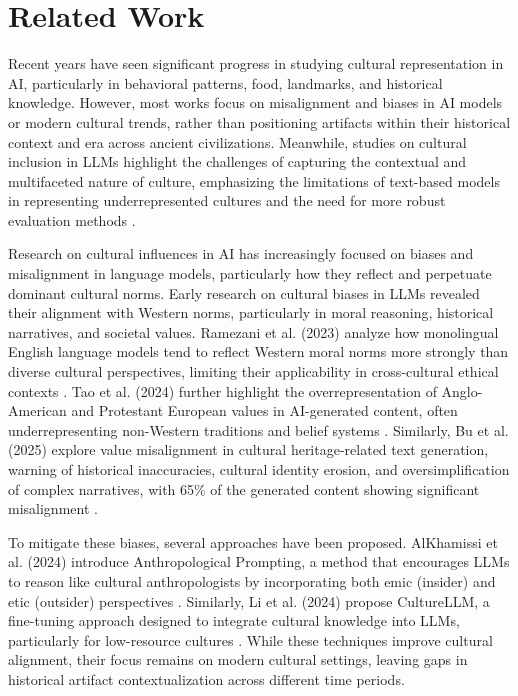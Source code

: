 \section{Related Work}
Recent years have seen significant progress in studying cultural representation in AI, particularly in behavioral patterns, food, landmarks, and historical knowledge. However, most works focus on misalignment and biases in AI models or modern cultural trends, rather than positioning artifacts within their historical context and era across ancient civilizations. Meanwhile, studies on cultural inclusion in LLMs highlight the challenges of capturing the contextual and multifaceted nature of culture, emphasizing the limitations of text-based models in representing underrepresented cultures and the need for more robust evaluation methods \cite{adilazuarda2024towards}.

Research on cultural influences in AI has increasingly focused on biases and misalignment in language models, particularly how they reflect and perpetuate dominant cultural norms. Early research on cultural biases in LLMs revealed their alignment with Western norms, particularly in moral reasoning, historical narratives, and societal values. Ramezani et al. (2023) analyze how monolingual English language models tend to reflect Western moral norms more strongly than diverse cultural perspectives, limiting their applicability in cross-cultural ethical contexts \cite{Ramezani2023KnowledgeOC}. Tao et al. (2024) further highlight the overrepresentation of Anglo-American and Protestant European values in AI-generated content, often underrepresenting non-Western traditions and belief systems \cite{tao2024cultural}. Similarly, Bu et al. (2025) explore value misalignment in cultural heritage-related text generation, warning of historical inaccuracies, cultural identity erosion, and oversimplification of complex narratives, with 65\% of the generated content showing significant misalignment \cite{bu2025investigation}.

To mitigate these biases, several approaches have been proposed. AlKhamissi et al. (2024) introduce Anthropological Prompting, a method that encourages LLMs to reason like cultural anthropologists by incorporating both emic (insider) and etic (outsider) perspectives \cite{AlKhamissi2024InvestigatingCA}. Similarly, Li et al. (2024) propose CultureLLM, a fine-tuning approach designed to integrate cultural knowledge into LLMs, particularly for low-resource cultures \cite{li2024culturellm}. While these techniques improve cultural alignment, their focus remains on modern cultural settings, leaving gaps in historical artifact contextualization across different time periods.

